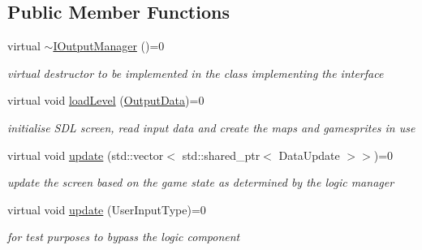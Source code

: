 \subsection*{Public Member Functions}
\begin{DoxyCompactItemize}
\item 
\mbox{\label{class_i_output_manager_a7442c5161bf453dc13605f7aaeeea2b5}} 
virtual \mbox{\hyperlink{class_i_output_manager_a7442c5161bf453dc13605f7aaeeea2b5}{$\sim$\+I\+Output\+Manager}} ()=0
\begin{DoxyCompactList}\small\item\em virtual destructor to be implemented in the class implementing the interface \end{DoxyCompactList}\item 
\mbox{\label{class_i_output_manager_a50a935d76cf10427b0977406a2338146}} 
virtual void \mbox{\hyperlink{class_i_output_manager_a50a935d76cf10427b0977406a2338146}{load\+Level}} (\mbox{\hyperlink{class_output_data}{Output\+Data}})=0
\begin{DoxyCompactList}\small\item\em initialise S\+DL screen, read input data and create the maps and gamesprites in use \end{DoxyCompactList}\item 
\mbox{\label{class_i_output_manager_a41892abec0b57bc1244492f42f32901b}} 
virtual void \mbox{\hyperlink{class_i_output_manager_a41892abec0b57bc1244492f42f32901b}{update}} (std\+::vector$<$ std\+::shared\+\_\+ptr$<$ Data\+Update $>$$>$)=0
\begin{DoxyCompactList}\small\item\em update the screen based on the game state as determined by the logic manager \end{DoxyCompactList}\item 
\mbox{\label{class_i_output_manager_aef1aaf499f3eee5927cb2833af39ce43}} 
virtual void \mbox{\hyperlink{class_i_output_manager_aef1aaf499f3eee5927cb2833af39ce43}{update}} (User\+Input\+Type)=0
\begin{DoxyCompactList}\small\item\em for test purposes to bypass the logic component \end{DoxyCompactList}\item 
$$
\end{DoxyCompactItemize}
